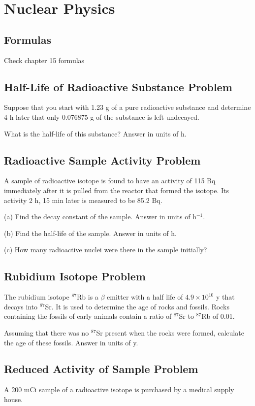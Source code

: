 \documentclass[../physics12.tex]{subfiles}
\begin{document}
\chapter{Nuclear Physics}
\section{Formulas}
Check chapter 15 formulas 

\section{Half-Life of Radioactive Substance Problem}
Suppose that you start with 1.23 g of a pure radioactive substance and determine 4 h later that only 0.076875 g of the substance is left undecayed.

What is the half-life of this substance? Answer in units of h.

\section{Radioactive Sample Activity Problem}
A sample of radioactive isotope is found to have an activity of 115 Bq immediately after it is pulled from the reactor that formed the isotope.
Its activity 2 h, 15 min later is measured to be 85.2 Bq.

(a) Find the decay constant of the sample. Answer in units of h$^{-1}$.

(b) Find the half-life of the sample. Answer in units of h.

(c) How many radioactive nuclei were there in the sample initially?

\section{Rubidium Isotope Problem}
The rubidium isotope $^{87}$Rb is a $\beta$ emitter with a half life of $4.9\times 10^{10}$ y that decays into $^{87}$Sr. It is used to determine 
the age of rocks and fossils. Rocks containing the fossils of early animals contain a ratio of $^{87}$Sr to $^{87}$Rb of 0.01.

Assuming that there was no $^{87}$Sr present when the rocks were formed, calculate the age of these fossils. Answer in units of y.

\section{Reduced Activity of Sample Problem}
A 200 mCi sample of a radioactive isotope is purchased by a medical supply house.
\end{document}
